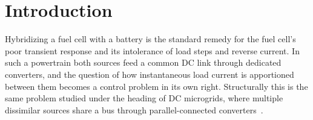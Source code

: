 %
%
%
%

\section{Introduction}
\label{sec:intro}

Hybridizing a fuel cell with a battery is the standard remedy for the fuel
cell's poor transient response and its intolerance of load steps and reverse
current. In such a powertrain both sources feed a common DC link through
dedicated converters, and the question of how instantaneous load current is
apportioned between them becomes a control problem in its own right. Structurally
this is the same problem studied under the heading of DC microgrids, where
multiple dissimilar sources share a bus through parallel-connected
converters~\cite{dragicevic2016part1,dragicevic2016part2,gao2018primary}.

